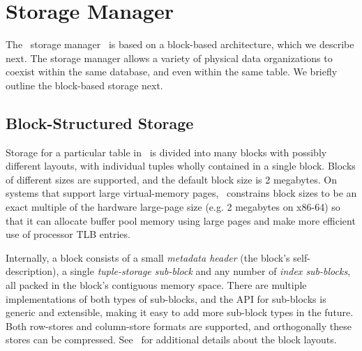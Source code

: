 
\section{Storage Manager} \label{storage-manager}

The \Quickstep\ storage manager~\cite{ChasseurP13} is based on a  block-based architecture, which we describe next. The storage manager allows a variety of physical data organizations to coexist within the same database, and even within the same table. We briefly outline the block-based storage next.

\subsection{Block-Structured Storage} \label{block-structure}
Storage for a particular table in \Quickstep\ is divided into many blocks with possibly different layouts, with individual tuples wholly contained in a single block. Blocks of different sizes are supported, and the default block size is 2 megabytes. On systems that support large virtual-memory pages, \Quickstep\ constrains block sizes to be an exact multiple of the hardware large-page size (e.g. 2 megabytes on x86-64) so that it can allocate buffer pool memory using large pages and make more efficient use of processor TLB entries.

Internally, a block consists of a small \textit{metadata header} (the block's self-description), a single \textit{tuple-storage sub-block} and any number of \textit{index sub-blocks}, all packed in the block's contiguous memory space. There are multiple implementations of both types of sub-blocks, and the API for sub-blocks is generic and extensible, making it easy to add more sub-block types in the future. Both row-stores and column-store formats are supported, and orthogonally these stores can be compressed. See~\cite{storage-blog-post} for additional details about the block layouts.


